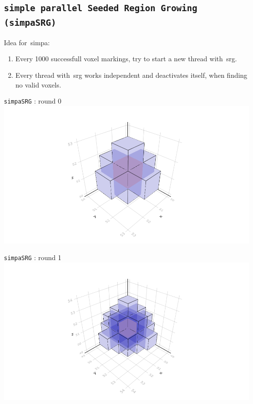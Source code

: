 \documentclass{beamer}
\begin{document}
\subsection{\texttt{simple parallel Seeded Region Growing (simpaSRG)}}
\begin{frame}{\insertsubsection}
  Idea for~\ac{simpa}: 
  \begin{enumerate}
    \item Every 1000 successfull voxel markings, try to start a new thread with~\ac{srg}.
    \item Every thread with~\ac{srg} works independent and deactivates itself, when finding no valid voxels.
  \end{enumerate}
\end{frame}
\begin{frame}{\texttt{simpaSRG} : round 0}
\includegraphics[trim=5cm 0.7cm 5cm 3cm, clip, width=1\linewidth]{algorithm_visualisation/srgthreads2/srg2threads0.png}\\
\end{frame}
\begin{frame}{\texttt{simpaSRG} : round 1}
\includegraphics[trim=5cm 0.7cm 5cm 3cm, clip, width=1\linewidth]{algorithm_visualisation/srgthreads2/srg2threads1.png}\\
\end{frame}
\end{document}
